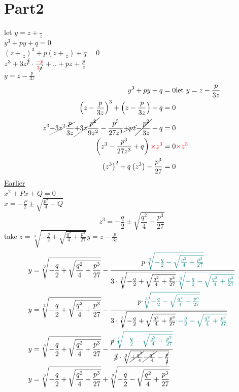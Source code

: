 \documentclass[A4]{ctexart}
\begin{document}
	\section*{Part2}
	let $y=z+\frac{}z$\\
		$y^3+py+q=0$\\
		$\left(z+\frac{}z\right)^3+p\left(z+\frac{}z\right)+q=0$\\
		$z^3+3z^{\cancel{2}}\cdot\frac{{\color{red}-p}}{{\color{red}3}\cancel{z}}+..+pz+\frac{p}{z}$\\
		$y=z-\frac{p}{3z}$
	\begin{align*}
		y^3+py+q&=0 \text{let }y=z-\frac{p}{3z}\\
		\left(z-\frac{p}{3z}\right)^3+\left(z-\frac{p}{3z}\right)+q&=0\\
		z^3\cancel{-3z^2\frac p{3z}}\cancel{+3z\frac {p^2}{9z^2}}-\frac{p^3}{27z^3}\cancel{+pz}\cancel{-\frac{p^2}{3z}}+q&=0\\
		\left(z^3-\frac{p^3}{27z^3}+q\right){\color{red}\times z^3}&=0{\color{red}\times z^3}\\
		\left(z^3\right)^2+q\left(z^3\right)-\frac{p^3}{27}&=0
	\end{align*}
	\underline{Earlier}\\
	$x^2+Px+Q=0$\\
	$x=-\frac P2\pm\sqrt{\frac{p^2}4-Q}$
	\[z^3=-\frac q2\pm\sqrt{\frac{q^2}4+\frac{p^3}{27}}\]
	take $z=\sqrt[3]{-\frac q2+\sqrt{\frac{q^2}4+\frac{p^3}{27}}}$\quad $y=z-\frac p{3z}$\\
	\begin{align*}
		y&=\sqrt[3]{-\frac q2+\sqrt{\frac{q^2}4+\frac{p^3}{27}}}-\frac{p{\color{teal}\cdot\sqrt[3]{-\frac q2-\sqrt{\frac{q^2}4+\frac{p^3}{27}}}}}{3\cdot\sqrt[3]{-\frac q2+\sqrt{\frac{q^2}4+\frac{p^3}{27}}}{\color{teal}\cdot\sqrt[3]{-\frac q2-\sqrt{\frac{q^2}4+\frac{p^3}{27}}}}}\\
		y&=\sqrt[3]{-\frac q2+\sqrt{\frac{q^2}4+\frac{p^3}{27}}}-\frac{p{\color{teal}\cdot\sqrt[3]{-\frac q2-\sqrt{\frac{q^2}4+\frac{p^3}{27}}}}}{3\cdot\sqrt[3]{-\frac q2+\sqrt{\frac{q^2}4+\frac{p^3}{27}}{\color{teal}\cdot{-\frac q2-\sqrt{\frac{q^2}4+\frac{p^3}{27}}}}}}\\
		y&=\sqrt[3]{-\frac{q}{2}+\sqrt{\frac{q^2}{4}+\frac{p^3}{27}}}
		-\frac{\cancel{p}{\color{teal}\cdot \sqrt[3]{-\frac{q}{2}-\sqrt{\frac{q^2}{4}+\frac{p^3}{27}}}}}
		{\cancel{3}\cdot\sqrt[3]{\cancel{+\frac{q^2}{4}} \cancel{-\frac{q^2}{4}}-\frac{\cancel{p}}{\cancel{3}}}}\\
		y&=\sqrt[3]{-\frac{q}{2}+\sqrt{\frac{q^2}{4}+\frac{p^3}{27}}}+\sqrt[3]{-\frac{q}{2}-\sqrt{\frac{q^2}{4}+\frac{p^3}{27}}}
	\end{align*}
\end{document}

